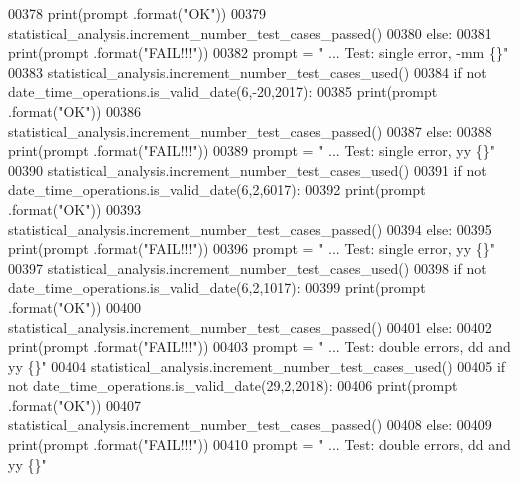 \begin{DoxyCode}
00378             print(prompt .format(\textcolor{stringliteral}{"OK"}))
00379             statistical\_analysis.increment\_number\_test\_cases\_passed()
00380         \textcolor{keywordflow}{else}:
00381             print(prompt .format(\textcolor{stringliteral}{"FAIL!!!"}))
00382         prompt = \textcolor{stringliteral}{"  ... Test: single error, -mm             \{\}"}
00383         statistical\_analysis.increment\_number\_test\_cases\_used()
00384         \textcolor{keywordflow}{if} \textcolor{keywordflow}{not} date\_time\_operations.is\_valid\_date(6,-20,2017):
00385             print(prompt .format(\textcolor{stringliteral}{"OK"}))
00386             statistical\_analysis.increment\_number\_test\_cases\_passed()
00387         \textcolor{keywordflow}{else}:
00388             print(prompt .format(\textcolor{stringliteral}{"FAIL!!!"}))
00389         prompt = \textcolor{stringliteral}{"  ... Test: single error, yy              \{\}"}
00390         statistical\_analysis.increment\_number\_test\_cases\_used()
00391         \textcolor{keywordflow}{if} \textcolor{keywordflow}{not} date\_time\_operations.is\_valid\_date(6,2,6017):
00392             print(prompt .format(\textcolor{stringliteral}{"OK"}))
00393             statistical\_analysis.increment\_number\_test\_cases\_passed()
00394         \textcolor{keywordflow}{else}:
00395             print(prompt .format(\textcolor{stringliteral}{"FAIL!!!"}))
00396         prompt = \textcolor{stringliteral}{"  ... Test: single error, yy              \{\}"}
00397         statistical\_analysis.increment\_number\_test\_cases\_used()
00398         \textcolor{keywordflow}{if} \textcolor{keywordflow}{not} date\_time\_operations.is\_valid\_date(6,2,1017):
00399             print(prompt .format(\textcolor{stringliteral}{"OK"}))
00400             statistical\_analysis.increment\_number\_test\_cases\_passed()
00401         \textcolor{keywordflow}{else}:
00402             print(prompt .format(\textcolor{stringliteral}{"FAIL!!!"}))
00403         prompt = \textcolor{stringliteral}{"  ... Test: double errors, dd and yy          \{\}"}
00404         statistical\_analysis.increment\_number\_test\_cases\_used()
00405         \textcolor{keywordflow}{if} \textcolor{keywordflow}{not} date\_time\_operations.is\_valid\_date(29,2,2018):
00406             print(prompt .format(\textcolor{stringliteral}{"OK"}))
00407             statistical\_analysis.increment\_number\_test\_cases\_passed()
00408         \textcolor{keywordflow}{else}:
00409             print(prompt .format(\textcolor{stringliteral}{"FAIL!!!"}))
00410         prompt = \textcolor{stringliteral}{"  ... Test: double errors, dd and yy          \{\}"}

\end{DoxyCode}
